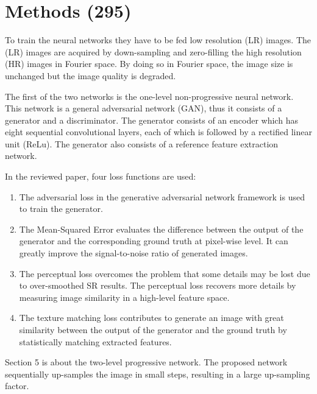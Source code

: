 \documentclass[conference]{IEEEtran}
\begin{document}
\section{Methods (295)}
To train the neural networks they have to be fed low resolution (LR) images. The
(LR) images are acquired by down-sampling and zero-filling the high resolution
(HR) images in Fourier space. By doing so in Fourier space, the image size is
unchanged but the image quality is degraded.

The first of the two networks is the one-level non-progressive neural network.
This network is a general adversarial network (GAN), thus it consists of a
generator and a discriminator. The generator consists of an encoder which has
eight sequential convolutional layers, each of which is followed by a rectified
linear unit (ReLu). The generator also consists of a reference feature
extraction network.

In the reviewed paper, four loss functions are used:
\begin{enumerate}
    \item The adversarial loss in the generative adversarial network framework is
    used to train the generator.
    \item The Mean-Squared Error evaluates the difference between the output of the
    generator and the corresponding ground truth at pixel-wise level. It can
    greatly improve the signal-to-noise ratio of generated images.
    \item The perceptual loss overcomes the problem that some details may be lost
    due to over-smoothed SR results. The perceptual loss recovers more details
    by measuring image similarity in a high-level feature space.
    \item The texture matching loss contributes to generate an image with great
    similarity between the output of the generator and the ground truth by
    statistically matching extracted features.
\end{enumerate}

Section 5 is about the two-level progressive network. The proposed network
sequentially up-samples the image in small steps, resulting in a large
up-sampling factor.
\end{document}
